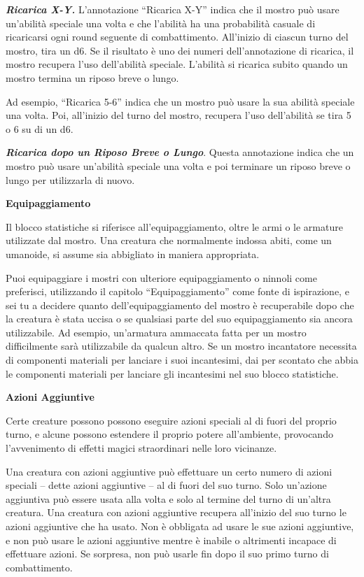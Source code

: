 \begin{multicols}{2}
\emph{\textbf{Ricarica X-Y.}} L'annotazione ``Ricarica X-Y'' indica che
il mostro può usare un'abilità speciale una volta e che l'abilità ha una
probabilità casuale di ricaricarsi ogni round seguente di combattimento.
All'inizio di ciascun turno del mostro, tira un d6. Se il risultato è
uno dei numeri dell'annotazione di ricarica, il mostro recupera l'uso
dell'abilità speciale. L'abilità si ricarica subito quando un mostro
termina un riposo breve o lungo.

Ad esempio, ``Ricarica 5-6'' indica che un mostro può usare la sua
abilità speciale una volta. Poi, all'inizio del turno del mostro,
recupera l'uso dell'abilità se tira 5 o 6 su di un d6.

\emph{\textbf{Ricarica dopo un Riposo Breve o Lungo}}. Questa
annotazione indica che un mostro può usare un'abilità speciale una volta
e poi terminare un riposo breve o lungo per utilizzarla di nuovo.

\textbf{Equipaggiamento}

Il blocco statistiche si riferisce all'equipaggiamento, oltre le armi o
le armature utilizzate dal mostro. Una creatura che normalmente indossa
abiti, come un umanoide, si assume sia abbigliato in maniera
appropriata.

Puoi equipaggiare i mostri con ulteriore equipaggiamento o ninnoli come
preferisci, utilizzando il capitolo ``Equipaggiamento'' come fonte di
ispirazione, e sei tu a decidere quanto dell'equipaggiamento del mostro
è recuperabile dopo che la creatura è stata uccisa o se qualsiasi parte
del suo equipaggiamento sia ancora utilizzabile. Ad esempio, un'armatura
ammaccata fatta per un mostro difficilmente sarà utilizzabile da qualcun altro.  Se un mostro incantatore necessita di componenti  materiali per lanciare i suoi incantesimi, dai per  scontato che abbia le componenti materiali per lanciare  gli incantesimi nel suo blocco statistiche.

\textbf{Azioni Aggiuntive}

Certe creature possono  possono eseguire azioni speciali al di fuori del proprio  turno, e alcune possono estendere il proprio potere  all'ambiente, provocando l'avvenimento di effetti magici  straordinari nelle loro vicinanze.

Una creatura con azioni aggiuntive può effettuare un certo  numero di azioni speciali -- dette azioni aggiuntive -- al  di fuori del suo turno. Solo un'azione aggiuntiva può  essere usata alla volta e solo al termine del turno di  un'altra creatura. Una creatura con azioni aggiuntive recupera  all'inizio del suo turno le azioni aggiuntive che ha  usato. Non è obbligata ad usare le sue azioni aggiuntive, e non può usare le azioni aggiuntive mentre è inabile o altrimenti incapace di effettuare  azioni. Se sorpresa, non può usarle fin dopo il suo  primo turno di combattimento.


\end{multicols}
